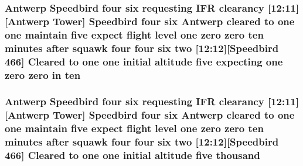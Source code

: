 \subsubsection[{\texorpdfstring{ten}{ten}}]{\setlength{\rightskip}{0pt plus 5cm}Antwerp Speedbird four {\bf six} requesting I\+FR clearancy \mbox{[}12\+:11\mbox{]}\mbox{[}Antwerp {\bf Tower}\mbox{]} Speedbird four {\bf six} Antwerp cleared to {\bf one} {\bf one} maintain five expect flight level {\bf one} {\bf zero} {\bf zero} ten minutes after squawk four four {\bf six} {\bf two} \mbox{[}12\+:12\mbox{]}\mbox{[}Speedbird 466\mbox{]} Cleared to {\bf one} {\bf one} initial altitude five expecting {\bf one} {\bf zero} {\bf zero} in ten}\hypertarget{ATC_8txt_aa96fd45f0174086569e3631bd320dc87}{}\label{ATC_8txt_aa96fd45f0174086569e3631bd320dc87}
\subsubsection[{\texorpdfstring{thousand}{thousand}}]{\setlength{\rightskip}{0pt plus 5cm}Antwerp Speedbird four {\bf six} requesting I\+FR clearancy \mbox{[}12\+:11\mbox{]}\mbox{[}Antwerp {\bf Tower}\mbox{]} Speedbird four {\bf six} Antwerp cleared to {\bf one} {\bf one} maintain five expect flight level {\bf one} {\bf zero} {\bf zero} {\bf ten} minutes after squawk four four {\bf six} {\bf two} \mbox{[}12\+:12\mbox{]}\mbox{[}Speedbird 466\mbox{]} Cleared to {\bf one} {\bf one} initial altitude five thousand}\hypertarget{ATC_8txt_ae9f8073b6a527ed0b92dd8164f312e3f}{}\label{ATC_8txt_ae9f8073b6a527ed0b92dd8164f312e3f}
